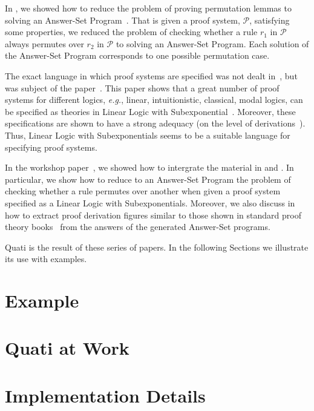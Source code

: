 \documentclass{llncs}
\newcommand\Pscr{\mathcal{P}}
\newcommand{\eg}{{\em e.g.}}
\begin{document}
In \cite{nigam13iclp}, we showed how to reduce the problem of proving permutation lemmas to solving an Answer-Set
Program~\cite{gelfond}. That is given a proof system, $\Pscr$, satisfying some properties, we reduced the problem 
of checking whether a rule $r_1$ in $\Pscr$ always permutes over $r_2$ in $\Pscr$ to solving an Answer-Set Program.
Each solution of the Answer-Set Program corresponds to one possible permutation case. 

The exact language in which proof systems are specified was not dealt in~\cite{nigam13iclp}, but was subject of 
the paper~\cite{nigam.jlc}. This paper shows that a great number of proof systems for different logics,
\eg, linear, intuitionistic, classical, modal logics, can be specified as theories in Linear Logic with Subexponential~\cite{nigam09ppdp}. Moreover, these specifications are shown to have a strong adequacy (on the level of derivations~\cite{nigam10jar}). Thus, Linear Logic
with Subexponentials seems to be a suitable language for specifying proof systems. 

In the workshop paper~\cite{nigam14ebl}, we showed how to intergrate the material in \cite{nigam13iclp} and \cite{nigam.jlc}.
In particular, we show how to reduce to an Answer-Set Program the problem of checking whether a rule permutes over another when given 
a proof system specified as a Linear Logic with Subexponentials. Moreover, we also discuss in \cite{nigam14ebl} how to extract proof derivation 
figures similar to those shown in standard proof theory books~\cite{troelstra} from the 
answers of the generated Answer-Set programs. 

Quati is the result of these series of papers. In the following Sections we illustrate its use 
with examples.

\section{Example}


\section{Quati at Work}

\section{Implementation Details}
\end{document}
